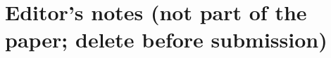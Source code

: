 \documentclass{article}
\theoremstyle{plain}
\theoremstyle{definition}
\theoremstyle{remark}
\begin{document}
\newpage
\section{Editor's notes (not part of the paper; delete before submission)}
\label{app:editors-notes}


\begingroup\small
\end{document}
